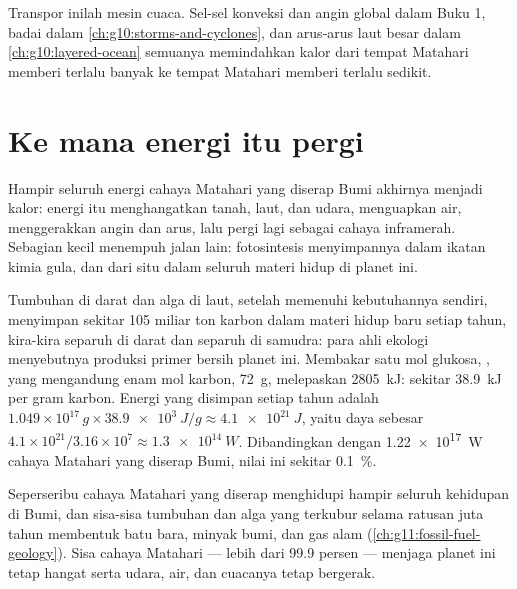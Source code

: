 Transpor inilah mesin cuaca. Sel-sel konveksi dan angin global dalam Buku 1,
badai dalam \cref{ch:g10:storms-and-cyclones}, dan arus-arus laut besar dalam
\cref{ch:g10:layered-ocean} semuanya memindahkan kalor dari tempat Matahari
memberi terlalu banyak ke tempat Matahari memberi terlalu sedikit.

\section{Ke mana energi itu pergi}

Hampir seluruh energi cahaya Matahari yang diserap Bumi akhirnya menjadi
kalor: energi itu menghangatkan tanah, laut, dan udara, menguapkan air,
menggerakkan angin dan arus, lalu pergi lagi sebagai cahaya inframerah.
Sebagian kecil menempuh jalan lain: fotosintesis menyimpannya dalam ikatan
kimia gula, dan dari situ dalam seluruh materi hidup di planet ini.

\begin{example}\label{ex:g10:earth-energy-budget:photosynthesis}
Tumbuhan di darat dan alga di laut, setelah memenuhi kebutuhannya sendiri,
menyimpan sekitar \num{105} miliar ton karbon dalam materi hidup baru setiap
tahun, kira-kira separuh di darat dan separuh di samudra: para ahli ekologi
menyebutnya produksi primer bersih planet ini. Membakar satu mol glukosa,
, yang mengandung enam mol karbon, \qty{72}{g}, melepaskan
\qty{2805}{kJ}: sekitar \qty{38.9}{kJ} per gram karbon. Energi yang disimpan
setiap tahun adalah $1.049\times10^{17}\,\unit{g} \times \qty{38.9e3}{J/g} \approx
\qty{4.1e21}{J}$, yaitu daya sebesar $4.1\times10^{21}/3.16\times10^{7} \approx
\qty{1.3e14}{W}$. Dibandingkan dengan \qty{1.22e17}{W} cahaya Matahari yang
diserap Bumi, nilai ini sekitar \qty{0.1}{\percent}.
\end{example}

\begin{remark}\label{rem:g10:earth-energy-budget:life}
Seperseribu cahaya Matahari yang diserap menghidupi hampir seluruh kehidupan
di Bumi, dan sisa-sisa tumbuhan dan alga yang terkubur selama ratusan juta
tahun membentuk batu bara, minyak bumi, dan gas alam
(\cref{ch:g11:fossil-fuel-geology}). Sisa cahaya Matahari --- lebih dari 99.9
persen --- menjaga planet ini tetap hangat serta udara, air, dan cuacanya
tetap bergerak.
\end{remark}

